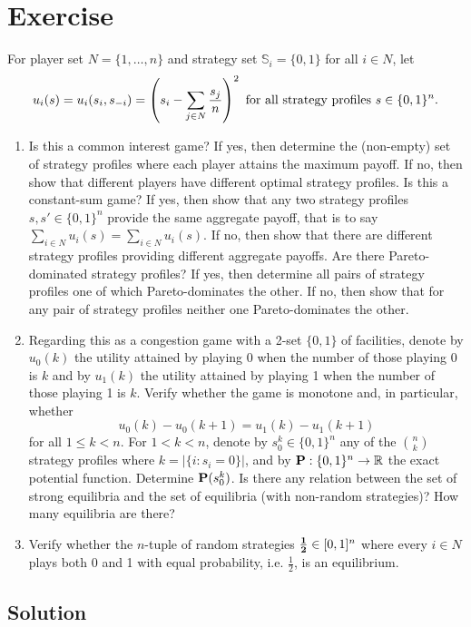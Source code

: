 \documentclass{article}
\begin{document}
\section{Exercise}
For player set $N=\{1,\ldots ,n\}$ and strategy set $\mathbb S_i=\{0,1\}$ for all $i\in N$, let
$$u_i(s)=u_i(s_i,s_{-i})=\left(s_i-\sum_{j\in N}\frac{s_j}{n}\right)^2\text{ for all strategy profiles }s\in\{0,1\}^n\text .$$
\begin{enumerate}
\item Is this a common interest game? If yes, then determine the (non-empty) set of strategy profiles where each player attains the maximum payoff. If no, then show
that different players have different optimal strategy profiles. Is this a constant-sum game? If yes, then show that any two strategy profiles $s,s'\in\{0,1\}^n$
provide the same aggregate payoff, that is to say $\sum_{i\in N}u_i(s)=\sum_{i\in N}u_i(s)$. If no, then show that there are different strategy profiles providing
different aggregate payoffs. Are there Pareto-dominated strategy profiles? If yes, then determine all pairs of strategy profiles one of which Pareto-dominates the
other. If no, then show that for any pair of strategy profiles neither one Pareto-dominates the other.

\item Regarding this as a congestion game with a 2-set $\{0,1\}$ of facilities, denote by $u_0(k)$ the utility attained by playing 0 when the number of those playing 0
is $k$ and by $u_1(k)$ the utility attained by playing 1 when the number of those playing 1 is $k$. Verify whether the game is monotone and, in particular, whether
$$u_0(k)-u_0(k+1)=u_1(k)-u_1(k+1)$$ for all $1\leq k<n$. For $1<k<n$, denote by $s_0^k\in\{0,1\}^n$ any of the $\binom{n}{k}$ strategy profiles where $k=|\{i:s_i=0\}|$,
and by $\textbf P:\{0,1\}^n\rightarrow\mathbb R$ the exact potential function. Determine $\textbf P(s_0^k)$. Is there any relation between the set of strong equilibria
and the set of equilibria (with non-random strategies)? How many equilibria are there?

\item Verify whether the $n$-tuple of random strategies $\frac{\textbf 1}{\textbf 2}\in[0,1]^n$ where every $i\in N$ plays both 0 and 1 with equal probability, i.e.
$\frac{1}{2}$, is an equilibrium. 
\end{enumerate}

\subsection{Solution}
\end{document}
